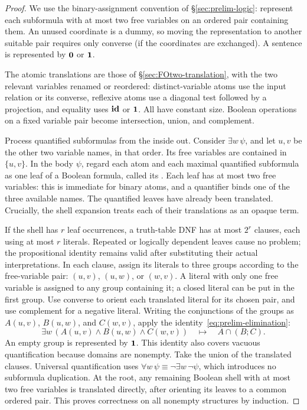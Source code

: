 \begin{proof}
We use the binary-assignment convention of \S\ref{sec:prelim-logic}:
represent each subformula with at most two free variables on an
ordered pair containing them. An unused coordinate is a dummy, so
moving the representation to another suitable pair requires only
converse (if the coordinates are exchanged). A sentence is represented
by $\mathbf{0}$ or $\mathbf{1}$.

The atomic translations are those of \S\ref{sec:FOtwo-translation},
with the two relevant variables renamed or reordered: distinct-variable
atoms use the input relation or its converse, reflexive atoms use a
diagonal test followed by a projection, and equality uses $\mathbf{id}$ or
$\mathbf{1}$. All have constant size. Boolean operations on a fixed
variable pair become intersection, union, and complement.

Process quantified subformulas from the inside out. Consider
$\exists w\,\psi$, and let $u,v$ be the other two variable names, in
that order. Its free variables are contained in $\{u,v\}$.
In the body $\psi$, regard each atom and each maximal quantified
subformula as one leaf of a Boolean formula, called its .
Each leaf has at most two free variables: this is immediate for binary
atoms, and a quantifier binds one of the three available names.
The quantified leaves have already been translated. Crucially, the
shell expansion treats each of their translations as an opaque term.

If the shell has $r$ leaf occurrences, a truth-table DNF has at most
$2^r$ clauses, each using at most $r$ literals. Repeated or logically
dependent leaves cause no problem; the propositional identity remains
valid after substituting their actual interpretations. In each clause,
assign its literals to three groups according to the free-variable pair:
$(u,v)$, $(u,w)$, or $(w,v)$. A literal with only one free variable is
assigned to any group containing it; a closed literal can be put in the
first group. Use converse to orient each translated literal for its
chosen pair, and use complement for a negative literal.
Writing the conjunctions of the groups as $A(u,v)$, $B(u,w)$, and
$C(w,v)$, apply the identity~\eqref{eq:prelim-elimination}:
\[
 \exists w\,(A(u,v)\land B(u,w)\land C(w,v))
       \quad\longmapsto\quad A\cap(B;C).
\]
An empty group is represented by $\mathbf{1}$. This identity also covers
vacuous quantification because domains are nonempty.
Take the union of the translated clauses. Universal quantification uses
$\forall w\,\psi\equiv\neg\exists w\,\neg\psi$, which introduces no
subformula duplication. At the root, any remaining Boolean shell with
at most two free variables is translated directly, after orienting its
leaves to a common ordered pair. This proves correctness on all nonempty
structures by induction.


\end{proof}
